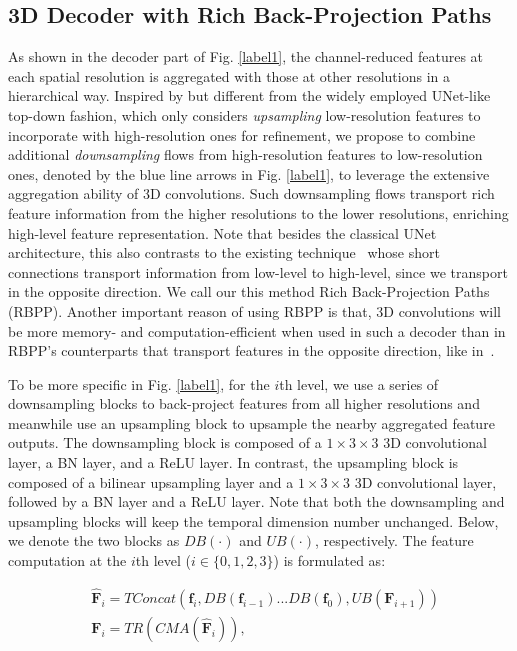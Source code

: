 \documentclass[letterpaper]{article}
\begin{document}
\subsection{3D Decoder with Rich Back-Projection Paths}
As shown in the decoder part of Fig. \ref{label1}, the channel-reduced features at each spatial resolution is aggregated with those at other resolutions in a hierarchical way. Inspired by but different from the widely employed UNet-like top-down fashion, which only considers \emph{upsampling} low-resolution features to incorporate with high-resolution ones for refinement, we propose to combine additional  \emph{downsampling} flows from high-resolution features to low-resolution ones, denoted by the blue line arrows in Fig. \ref{label1}, to leverage the extensive aggregation ability of 3D convolutions. Such downsampling flows transport rich feature information from the higher resolutions to the lower resolutions, enriching high-level feature representation. Note that besides the classical UNet architecture, this also contrasts to the existing technique~\cite{hou2017deeply} whose short connections transport information from low-level to high-level, since we transport in the opposite direction. We call our this method Rich Back-Projection Paths (RBPP). Another important reason of using RBPP is that, 3D convolutions will be more memory- and computation-efficient when used in such a decoder than in RBPP's counterparts that transport features in the opposite direction, like in~\cite{hou2017deeply}.

To be more specific in Fig. \ref{label1}, for the $i$th level, we use a series of downsampling blocks to back-project features from all higher resolutions and meanwhile use an upsampling block to upsample the nearby aggregated feature outputs. The downsampling block is composed of a $1\times3\times3$ 3D convolutional layer, a BN layer, and a ReLU layer. In contrast, the upsampling block is composed of a bilinear upsampling layer and a $1\times3\times3$ 3D convolutional layer, followed by a BN layer and a ReLU layer. Note that both the downsampling and upsampling blocks will keep the temporal dimension number unchanged. Below, we denote the two blocks as $DB(\cdot)$ and $UB(\cdot)$, respectively. The feature computation at the $i$th level ($i\in\{0,1,2,3\}$) is formulated as:

\vspace{-0.2cm}
\begin{align}
   & \mathbf{\hat F}_{i} =  TConcat(\mathbf{f}_{i}, DB(\mathbf{f}_{i-1})...DB(\mathbf{f}_{0}), UB(\mathbf{F}_{i+1}))\label{equ2}\\
   & \mathbf{F}_{i}=TR(CMA(\mathbf {\hat F}_{i})),
	\label{equ3}
\end{align}
\end{document}
